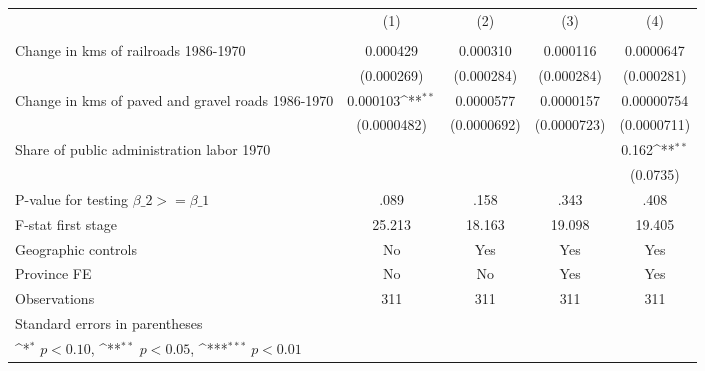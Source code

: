 {
\def\sym#1{\ifmmode^{#1}\else\(^{#1}\)\fi}
\begin{tabular}{l*{4}{c}}
\hline\hline
                &\multicolumn{1}{c}{(1)}&\multicolumn{1}{c}{(2)}&\multicolumn{1}{c}{(3)}&\multicolumn{1}{c}{(4)}\\
                &\multicolumn{1}{c}{}&\multicolumn{1}{c}{}&\multicolumn{1}{c}{}&\multicolumn{1}{c}{}\\
\hline
Change in kms of railroads 1986-1970& 0.000429         & 0.000310         & 0.000116         &0.0000647         \\
                &(0.000269)         &(0.000284)         &(0.000284)         &(0.000281)         \\
[1em]
Change in kms of paved and gravel roads 1986-1970& 0.000103\sym{**} &0.0000577         &0.0000157         &0.00000754         \\
                &(0.0000482)         &(0.0000692)         &(0.0000723)         &(0.0000711)         \\
[1em]
Share of public administration labor 1970&                  &                  &                  &    0.162\sym{**} \\
                &                  &                  &                  & (0.0735)         \\
\hline
P-value for testing $\beta\_{2} >= \beta\_{1}$&     .089         &     .158         &     .343         &     .408         \\
F-stat first stage&   25.213         &   18.163         &   19.098         &   19.405         \\
Geographic controls&       No         &      Yes         &      Yes         &      Yes         \\
Province FE     &       No         &       No         &      Yes         &      Yes         \\
Observations    &      311         &      311         &      311         &      311         \\
\hline\hline
\multicolumn{5}{l}{\footnotesize Standard errors in parentheses}\\
\multicolumn{5}{l}{\footnotesize \sym{*} \(p<0.10\), \sym{**} \(p<0.05\), \sym{***} \(p<0.01\)}\\
\end{tabular}
}
